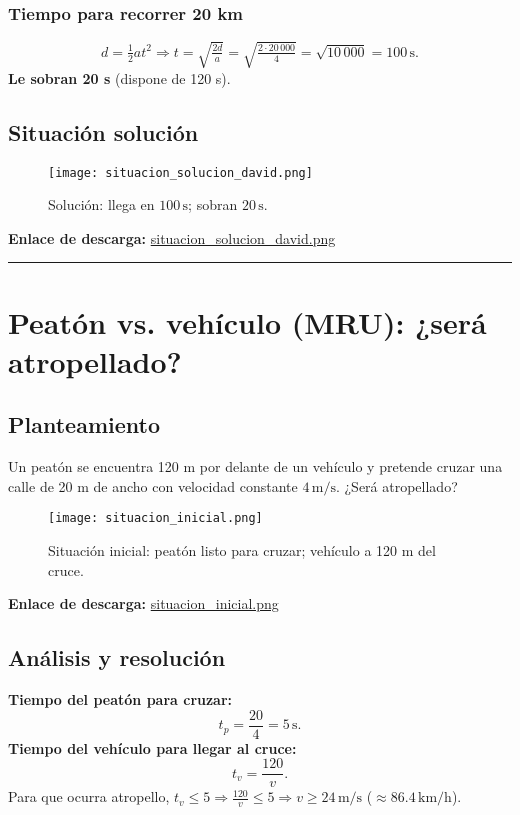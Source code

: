 \documentclass[14pt,letterpaper]{extarticle} %
\begin{document}
\subsubsection*{Tiempo para recorrer 20 km}
\[
d=\tfrac{1}{2} a t^2 \Rightarrow t=\sqrt{\tfrac{2d}{a}}
=\sqrt{\tfrac{2\cdot 20\,000}{4}}=\sqrt{10\,000}=100\,\text{s}.
\]
\textbf{Le sobran 20 s} (dispone de 120 s).

\subsection{Situación solución}
\begin{figure}[h!]
  \centering
  \texttt{[image: situacion\_solucion\_david.png]}
  \caption{Solución: llega en \(100\,\text{s}\); sobran \(20\,\text{s}\).}
\end{figure}
\noindent\textbf{Enlace de descarga:} \href{run:imagenes/situacion_solucion_david.png}{situacion\_solucion\_david.png}

\bigskip
\hrule
\bigskip

\section{Peatón vs. vehículo (MRU): ¿será atropellado?}

\subsection{Planteamiento}
Un peatón se encuentra 120 m por delante de un vehículo y pretende cruzar una calle de 20 m de ancho con velocidad constante \(4\,\text{m/s}\). ¿Será atropellado?

\begin{figure}[h!]
  \centering
  \texttt{[image: situacion\_inicial.png]}
  \caption{Situación inicial: peatón listo para cruzar; vehículo a 120 m del cruce.}
\end{figure}
\noindent\textbf{Enlace de descarga:} \href{run:imagenes/situacion_inicial.png}{situacion\_inicial.png}

\subsection{Análisis y resolución}
\textbf{Tiempo del peatón para cruzar:}
\[
t_p=\frac{20}{4}=5\,\text{s}.
\]
\textbf{Tiempo del vehículo para llegar al cruce:}
\[
t_v=\frac{120}{v}.
\]
Para que ocurra atropello, \(t_v\le 5\Rightarrow \frac{120}{v}\le 5 \Rightarrow v\ge 24\,\text{m/s}\) (\(\approx 86.4\,\text{km/h}\)).
\end{document}
